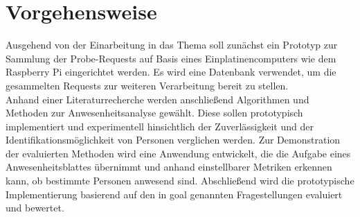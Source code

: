 \section{Vorgehensweise}\label{approach}

Ausgehend von der Einarbeitung in das Thema soll zunächst ein Prototyp zur Sammlung der Probe-Requests auf Basis eines Einplatinencomputers wie dem Raspberry Pi eingerichtet werden.
Es wird eine Datenbank verwendet, um die gesammelten Requests zur weiteren Verarbeitung bereit zu stellen.
\\

Anhand einer Literaturrecherche werden anschließend Algorithmen und Methoden zur Anwesenheitsanalyse gewählt.
Diese sollen prototypisch implementiert und experimentell hinsichtlich der Zuverlässigkeit und der Identifikationsmöglichkeit von Personen verglichen werden.
Zur Demonstration der evaluierten Methoden wird eine Anwendung entwickelt, die die Aufgabe eines Anwesenheitsblattes übernimmt und anhand einstellbarer Metriken erkennen kann, ob bestimmte Personen anwesend sind.
Abschließend wird die prototypische Implementierung basierend auf den in \refname{goal} genannten Fragestellungen evaluiert und bewertet.